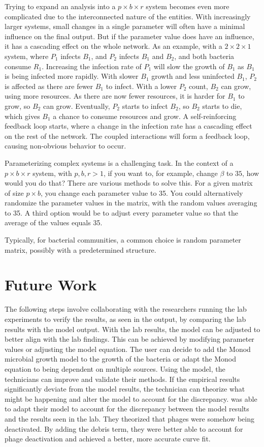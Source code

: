 Trying to expand an analysis into a $p\times b\times r$ system becomes even more complicated due to the interconnected nature of the entities. 
With increasingly larger systems, small changes in a single parameter will often have a minimal influence on the final output. 
But if the parameter value does have an influence, it has a cascading effect on the whole network. 
As an example, with a $2\times 2\times 1$ system, where $P_1$ infects $B_1$, and $P_2$ infects $B_1$ and $B_2$, and both bacteria consume $R_1$.  
Increasing the infection rate of $P_1$ will slow the growth of $B_1$ as $B_1$ is being infected more rapidly. 
With slower $B_1$ growth and less uninfected $B_1$, $P_2$ is affected as there are fewer $B_1$ to infect. With a lower $P_2$ count, $B_2$ can grow, using more resources. 
As there are now fewer resources, it is harder for $B_1$ to grow, so $B_2$ can grow. 
Eventually, $P_2$ starts to infect $B_2$, so $B_2$ starts to die, which gives $B_1$ a chance to consume resources and grow. 
A self-reinforcing feedback loop starts, where a change in the infection rate has a cascading effect on the rest of the network. 
The coupled interactions will form a feedback loop, causing non-obvious behavior to occur. 

Parameterizing complex systems is a challenging task. 
In the context of a $p\times b\times r$ system, with $p, b, r > 1$, if you want to, for example, change $\beta$ to $35$, how would you do that? 
There are various methods to solve this. 
For a given matrix of size $p\times b$, you change each parameter value to 35. 
You could alternatively randomize the parameter values in the matrix, with the random values averaging to 35. 
A third option would be to adjust every parameter value so that the average of the values equals 35. 

Typically, for bacterial communities, a common choice is random parameter matrix, possibly with a predetermined structure. 

\section{Future Work}
\label{Future Work}
The following steps involve collaborating with the researchers running the lab experiments to verify the results, as seen in the output, by comparing the lab results with the model output. 
With the lab results, the model can be adjusted to better align with the lab findings. 
This can be achieved by modifying parameter values or adjusting the model equation. 
The user can decide to add the Monod microbial growth model to the growth of the bacteria or adapt the Monod equation to being dependent on multiple sources. 
Using the model, the technicians can improve and validate their methods. 
If the empirical results significantly deviate from the model results, the technician can theorize what might be happening and alter the model to account for the discrepancy. 
\citet{deyEmergentHigherorderInteractions2025} was able to adapt their model to account for the discrepancy between the model results and the results seen in the lab. 
They theorized that phages were somehow being deactivated. 
By adding the debris term, they were better able to account for phage deactivation and achieved a better, more accurate curve fit. 

